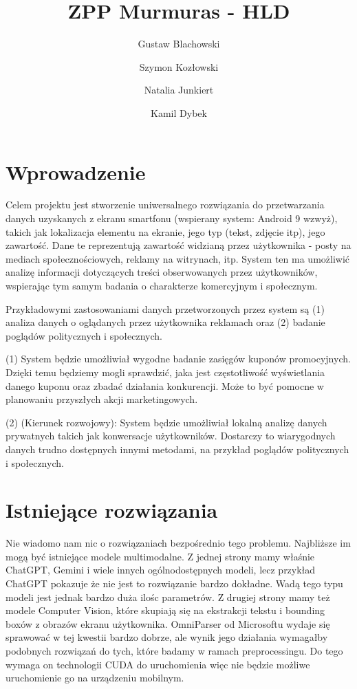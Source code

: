 \documentclass[12pt]{article}
\title{ZPP Murmuras - HLD}
\author{Gustaw Blachowski \and Szymon Kozłowski \and Natalia Junkiert \and Kamil Dybek}
\date{}
\begin{document}
\maketitle

\section*{Wprowadzenie}
Celem projektu jest stworzenie uniwersalnego rozwiązania do przetwarzania danych uzyskanych z ekranu smartfonu (wspierany system: Android 9 wzwyż), takich jak lokalizacja elementu na ekranie, jego typ (tekst, zdjęcie itp), jego zawartość.
Dane te reprezentują zawartość widzianą przez użytkownika - posty na mediach społecznościowych, reklamy na witrynach, itp.
System ten ma umożliwić analizę informacji dotyczących treści obserwowanych przez użytkowników, wspierając tym samym badania o charakterze komercyjnym i społecznym.

Przykładowymi zastosowaniami danych przetworzonych przez system są (1) analiza danych o oglądanych przez użytkownika reklamach oraz (2) badanie poglądów politycznych i społecznych.

(1) System będzie umożliwiał wygodne badanie zasięgów kuponów promocyjnych. Dzięki temu będziemy mogli sprawdzić, jaka jest częstotliwość wyświetlania danego kuponu oraz zbadać działania konkurencji. Może to być pomocne w planowaniu przyszłych akcji marketingowych.

(2) (Kierunek rozwojowy): System będzie umożliwiał lokalną analizę danych prywatnych takich jak konwersacje użytkowników. Dostarczy to wiarygodnych danych trudno dostępnych innymi metodami, na przykład poglądów politycznych i społecznych.
\section*{Istniejące rozwiązania}
Nie wiadomo nam nic o rozwiązaniach bezpośrednio tego problemu. Najbliższe im mogą być istniejące modele multimodalne.
Z jednej strony mamy właśnie ChatGPT, Gemini i wiele innych ogólnodostępnych modeli, lecz przykład ChatGPT pokazuje że nie jest to rozwiązanie bardzo dokładne. Wadą tego typu modeli jest jednak bardzo duża ilośc parametrów. Z drugiej strony mamy też modele Computer Vision, które skupiają się na ekstrakcji tekstu i bounding boxów z obrazów ekranu użytkownika. OmniParser od Microsoftu wydaje się sprawować w tej kwestii bardzo dobrze, ale wynik jego działania wymagałby podobnych rozwiązań do tych, które badamy w ramach preprocessingu. Do tego wymaga on technologii CUDA do uruchomienia więc nie będzie możliwe uruchomienie go na urządzeniu mobilnym.
\end{document}
